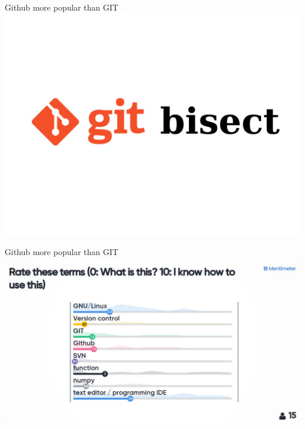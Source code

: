 \begin{frame}[fragile]{Github more popular than GIT}
    \includegraphics[width=\textwidth]{images/git-bisect.pdf}
\end{frame}


\begin{frame}[fragile]{Github more popular than GIT}
    \includegraphics[width=\textwidth]{images/github-more-popular-than-git.pdf}
\end{frame}


